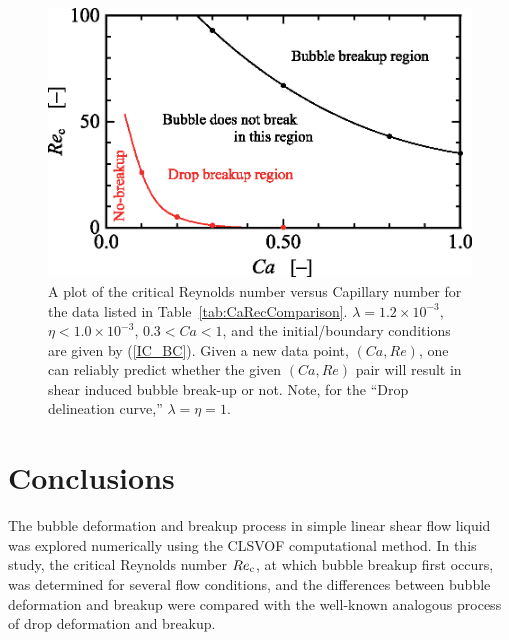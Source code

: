 \documentclass[review]{elsarticle}
\begin{document}
\begin{figure}%
  \centering
  \includegraphics[width=\textwidth]{12-CaRecFit}
  \caption{A plot of the critical Reynolds number versus Capillary number
	for the data listed in Table~\ref{tab:CaRecComparison}.  
	$\lambda = 1.2 \times 10^{-3}$, 
	$\eta < 1.0 \times 10^{-3}$, $0.3<Ca<1$, and
        the initial/boundary conditions are given by (\ref{IC_BC}).
	Given a new data point, $(Ca,Re)$, one
	can reliably predict whether the 
	given $(Ca,Re)$ pair will result in shear
	induced bubble break-up or not.  Note, for the ``Drop delineation
	curve,'' $\lambda=\eta=1$.
	   }
  \label{fig:CaRecFit}
\end{figure}
%

\section{Conclusions}
The bubble deformation and breakup process in simple linear shear flow liquid
was explored numerically using the CLSVOF computational method.  In this study,
the critical Reynolds number $Re_{\rm c}$, at which bubble breakup first occurs,
was determined for several flow conditions, and the differences between bubble
deformation and breakup were compared with the well-known analogous process of
drop deformation and breakup.
\end{document}
